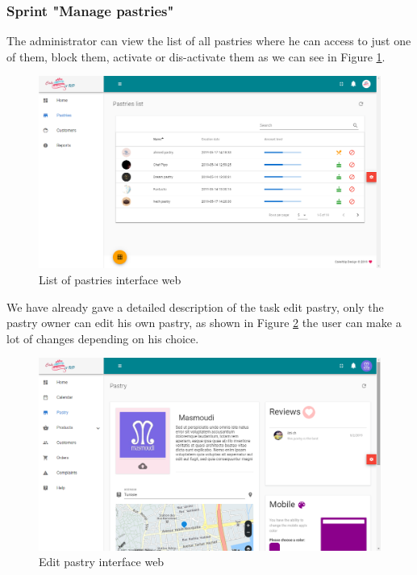 \documentclass[12pt,a4paper]{report}
\begin{document}
\subsubsection*{Sprint "Manage pastries"}
The administrator can view the list of all pastries where he can access to just one of them, block them, activate or dis-activate them as we can see in Figure \ref{pastrylist-interface}.
\begin{figure}[H]
	\centering
	\includegraphics[width=5.6in,keepaspectratio]{pastry-list.png}
	\caption{List of pastries interface web}
	\label{pastrylist-interface}
\end{figure} 

We have already gave a detailed description of the task edit pastry, only the pastry owner can edit his own pastry, as shown in Figure \ref{editpastry-interface} the user can make a lot of changes depending on his choice.
\begin{figure}[H]
	\centering
	\includegraphics[width=6in,keepaspectratio]{edit-pastry.png}
	\caption{Edit pastry interface web}
	\label{editpastry-interface}
\end{figure} 
\end{document}
